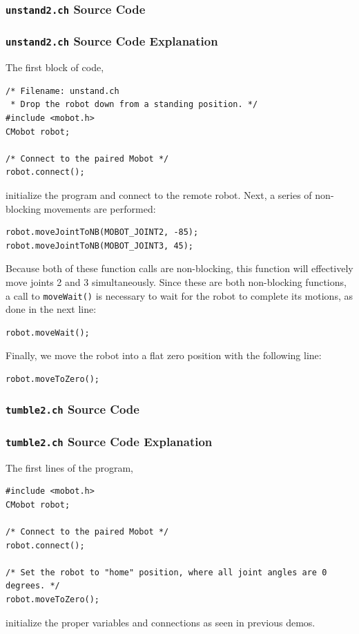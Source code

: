 \documentclass{article}
\begin{document}
\subsubsection{\texttt{unstand2.ch} Source Code}

\subsubsection{\texttt{unstand2.ch} Source Code Explanation}
The first block of code,
\begin{verbatim}
/* Filename: unstand.ch 
 * Drop the robot down from a standing position. */
#include <mobot.h>
CMobot robot;

/* Connect to the paired Mobot */
robot.connect();
\end{verbatim}
initialize the program and connect to the remote robot. Next, a series of
non-blocking movements are performed:
\begin{verbatim}
robot.moveJointToNB(MOBOT_JOINT2, -85);
robot.moveJointToNB(MOBOT_JOINT3, 45);
\end{verbatim}
Because both of these function calls are non-blocking, this function will
effectively move joints 2 and 3 simultaneously. Since these are both
non-blocking functions, a call to \texttt{moveWait()} is necessary to
wait for the robot to complete its motions, as done in the next line:
\begin{verbatim}
robot.moveWait();
\end{verbatim}

Finally, we move the robot into a flat zero position with the following line:
\begin{verbatim}
robot.moveToZero();
\end{verbatim}

\subsubsection{\texttt{tumble2.ch} Source Code}

\subsubsection{\texttt{tumble2.ch} Source Code Explanation}
The first lines of the program,
\begin{verbatim}
#include <mobot.h>
CMobot robot;

/* Connect to the paired Mobot */
robot.connect();

/* Set the robot to "home" position, where all joint angles are 0 degrees. */
robot.moveToZero();
\end{verbatim}
initialize the proper variables and connections as seen in previous demos.
\end{document}
